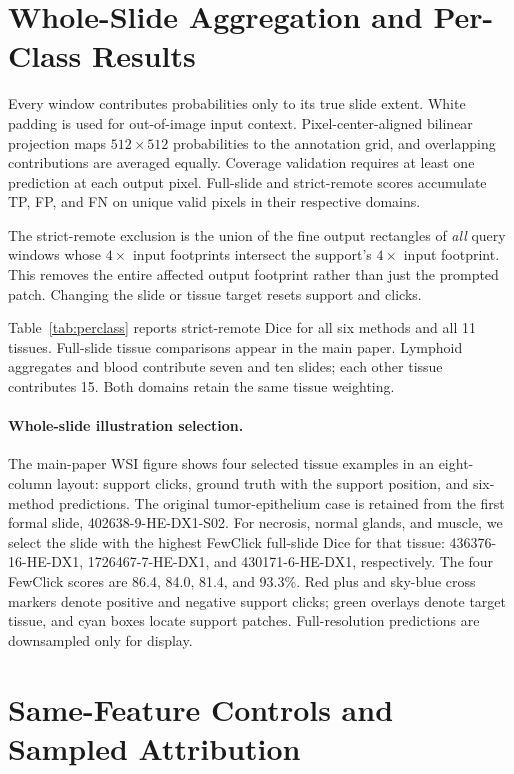 \section{Whole-Slide Aggregation and Per-Class Results}
Every window contributes probabilities only to its true slide extent. White padding is used for out-of-image input context. Pixel-center-aligned bilinear projection maps $512\times512$ probabilities to the annotation grid, and overlapping contributions are averaged equally. Coverage validation requires at least one prediction at each output pixel. Full-slide and strict-remote scores accumulate TP, FP, and FN on unique valid pixels in their respective domains.

The strict-remote exclusion is the union of the fine output rectangles of \emph{all} query windows whose $4\times$ input footprints intersect the support's $4\times$ input footprint. This removes the entire affected output footprint rather than just the prompted patch. Changing the slide or tissue target resets support and clicks.


Table~\ref{tab:perclass} reports strict-remote Dice for all six methods and all 11 tissues. Full-slide tissue comparisons appear in the main paper. Lymphoid aggregates and blood contribute seven and ten slides; each other tissue contributes 15. Both domains retain the same tissue weighting.

\paragraph{Whole-slide illustration selection.}
The main-paper WSI figure shows four selected tissue examples in an eight-column layout: support clicks, ground truth with the support position, and six-method predictions. The original tumor-epithelium case is retained from the first formal slide, 402638-9-HE-DX1-S02. For necrosis, normal glands, and muscle, we select the slide with the highest FewClick full-slide Dice for that tissue: 436376-16-HE-DX1, 1726467-7-HE-DX1, and 430171-6-HE-DX1, respectively. The four FewClick scores are 86.4, 84.0, 81.4, and 93.3\%. Red plus and sky-blue cross markers denote positive and negative support clicks; green overlays denote target tissue, and cyan boxes locate support patches. Full-resolution predictions are downsampled only for display.

\section{Same-Feature Controls and Sampled Attribution}

